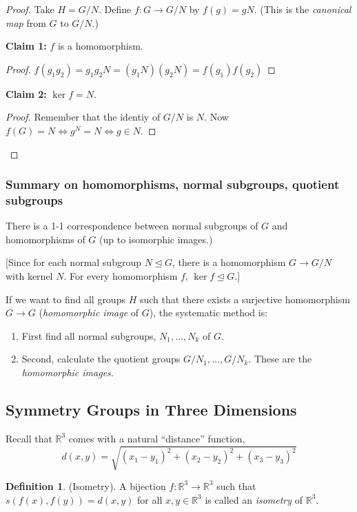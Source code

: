 \documentclass{article}
\theoremstyle{definition}
\newtheorem{definition}{Definition}
\newcommand{\reals}{\mathbb{R}}
\begin{document}
  \begin{proof}
    Take $H=G/N$. Define $f:G \rightarrow G/N$ by $f(g)=gN$. (This is the \textit{canonical map} from $G$ to $G/N$.)

    \textbf{Claim 1:} $f$ is a homomorphism.

    \begin{proof}
      $f(g_1g_2)=g_1g_2N=(g_1N)(g_2N)=f(g_1)f(g_2)$
    \end{proof}

    \textbf{Claim 2:} $\ker f = N$.
    \begin{proof}
      Remember that the identiy of $G/N$ is $N$. Now $f(G)=N \iff g^N = N \iff g \in N$.
    \end{proof}
  \end{proof}

  \subsubsection*{Summary on homomorphisms, normal subgroups, quotient subgroups}
  There is a 1-1 correspondence between normal subgroups of $G$ and homomorphisms
  of $G$ (up to isomorphic images.)

  [Since for each normal subgroup $N \trianglelefteq G$, there is a homomorphism $G \rightarrow G/N$ with kernel $N$. For every homomorphism $f$, $\ker f \trianglelefteq G$.]

  If we want to find all groups $H$ such that there exists a surjective homomorphism
  $G \rightarrow G$ (\textit{homomorphic image} of $G$), the systematic method is:
  \begin{enumerate}
    \item First find all normal subgroups, $N_1, \dots, N_k$ of $G$.
    \item Second, calculate the quotient groups $G/N_1, \dots, G/N_k$. These are the \textit{homomorphic images.}
  \end{enumerate}

  \subsection{Symmetry Groups in Three Dimensions}

  Recall that $\reals^3$  comes with a natural ``distance'' function,
  \[
    d(x,y)=\sqrt{(x_1 - y_1)^2 + (x_2 - y_2)^2 + (x_3 - y_3)^2}
  \]

  \begin{definition}
    (Isometry). A bijection $f:\reals^3 \rightarrow \reals^3$ such that $s(f(x),f(y))=d(x,y)$ for all $x,y \in \reals^3$ is called an \textit{isometry} of $\reals^3$.
  \end{definition}
\end{document}
